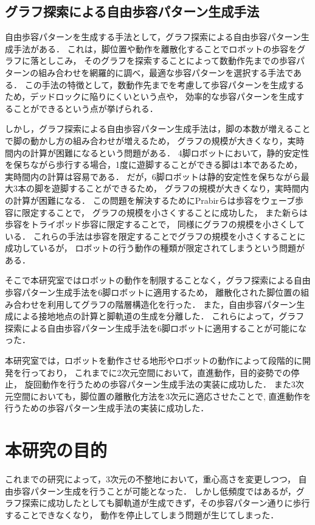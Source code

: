\subsection{グラフ探索による自由歩容パターン生成手法}
自由歩容パターンを生成する手法として，グラフ探索による自由歩容パターン生成手法がある\cite{Prabir_Graph_search}．
これは，脚位置や動作を離散化することでロボットの歩容をグラフに落としこみ，
そのグラフを探索することによって数動作先までの歩容パターンの組み合わせを網羅的に調べ，最適な歩容パターンを選択する手法である．
この手法の特徴として，数動作先までを考慮して歩容パターンを生成するため，デッドロックに陥りにくいという点や，
効率的な歩容パターンを生成することができるという点が挙げられる．

しかし，グラフ探索による自由歩容パターン生成手法は，脚の本数が増えることで脚の動かし方の組み合わせが増えるため，
グラフの規模が大きくなり，実時間内の計算が困難になるという問題がある．
4脚ロボットにおいて，静的安定性を保ちながら歩行する場合，1度に遊脚することができる脚は1本であるため，
実時間内の計算は容易である．
だが，6脚ロボットは静的安定性を保ちながら最大3本の脚を遊脚することができるため，
グラフの規模が大きくなり，実時間内の計算が困難になる．
この問題を解決するためにPrabirらは歩容をウェーブ歩容に限定することで，
グラフの規模を小さくすることに成功した\cite{Prabir_Graph_search_Six}，
また新らは歩容をトライポッド歩容に限定することで\cite{Arata_Graph_search_Six}，
同様にグラフの規模を小さくしている．
これらの手法は歩容を限定することでグラフの規模を小さくすることに成功しているが，
ロボットの行う動作の種類が限定されてしまうという問題がある．

そこで本研究室ではロボットの動作を制限することなく，グラフ探索による自由歩容パターン生成手法を6脚ロボットに適用するため，
離散化された脚位置の組み合わせを利用してグラフの階層構造化を行った．
また，自由歩容パターン生成による接地地点の計算と脚軌道の生成を分離した．
これらによって，グラフ探索による自由歩容パターン生成手法を6脚ロボットに適用することが可能になった．

本研究室では，ロボットを動作させる地形やロボットの動作によって段階的に開発を行っており，
これまでに2次元空間において，直進動作\cite{Oki_Graph_search}，目的姿勢での停止\cite{Nakaoka_Graph_search}，
旋回動作\cite{Shina_Graph_search}を行うための歩容パターン生成手法の実装に成功した．
また3次元空間においても，脚位置の離散化方法を3次元に適応させたことで\cite{Miura_Graph_search},
直進動作\cite{Hato_Graph_search}を行うための歩容パターン生成手法の実装に成功した．

\section{本研究の目的}
これまでの研究によって，3次元の不整地において，重心高さを変更しつつ，
自由歩容パターン生成を行うことが可能となった．
しかし低頻度ではあるが，グラフ探索に成功したとしても脚軌道が生成できず，その歩容パターン通りに歩行することできなくなり，
動作を停止してしまう問題が生じてしまった．

